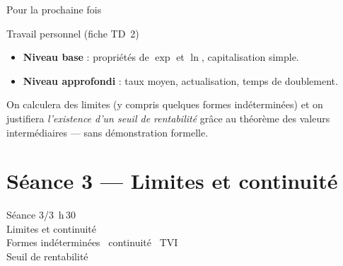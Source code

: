 \documentclass[10pt,aspectratio=169]{beamer}
\numberwithin{dummy}{section}
\begin{document}
\begin{frame}{Pour la prochaine fois}
\begin{block}{Travail personnel (fiche TD~2)}
\begin{itemize}
    \item \textbf{Niveau base} : propriétés de $\exp$ et $\ln$, capitalisation simple.
    \item \textbf{Niveau approfondi} : taux moyen, actualisation, temps de doublement.
\end{itemize}
\end{block}

\vspace{0.45em}
\begin{boxgestion}
On calculera des limites (y compris quelques formes indéterminées)
et on justifiera \emph{l'existence d'un seuil de rentabilité}
grâce au théorème des valeurs intermédiaires --- sans démonstration formelle.
\end{boxgestion}
\end{frame}


\part{Séance 3 --- Limites et continuité}

\begin{frame}[plain]
\centering
\vspace{1.6cm}
{\Large Séance 3/3 \quad\textemdash{}\,h\,30}\\[0.8em]
{ Limites et continuité}\\[1.2em]
{\large Formes indéterminées \textbullet\ continuité \textbullet\ TVI}\\[0.4em]
{\large Seuil de rentabilité}
\end{frame}
\end{document}
